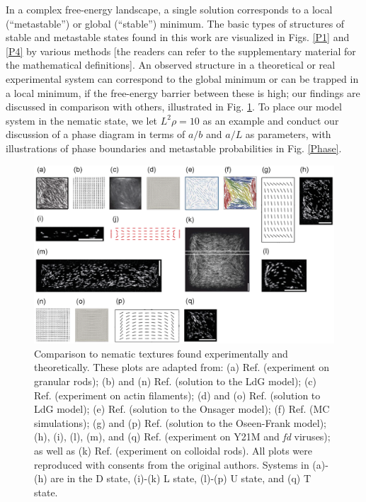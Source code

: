 \documentclass[prl,twocolumn,preprintnumbers,reprint]{revtex4}
\begin{document}
In a complex free-energy landscape, a single solution corresponds to a local (``metastable'') or global (``stable'') minimum.
The basic types of structures of stable and metastable states found in this work are visualized in Figs. \ref{P1} and \ref{P4} by various methods [the readers can refer to the supplementary material for the mathematical definitions]. An observed structure in a theoretical or real experimental system can correspond to the global minimum or can be trapped in a local minimum, if the free-energy barrier between these is high; our findings are discussed in comparison with others, illustrated in Fig. \ref{P12}. To place our model system in the nematic state, we let $L^2 \rho =10$ as an example and conduct our discussion of a phase diagram in terms of $a/b$ and $a/L$ as parameters, with illustrations of phase boundaries and metastable probabilities in Fig. \ref{Phase}.\\



\begin{figure}[!t]\begin{center}
\includegraphics[width = 2\columnwidth]{eps/expCh.eps}
\caption{Comparison to nematic textures found experimentally and theoretically.
These plots are adapted from: (a) Ref. \cite{Galanis2006} (experiment on granular rods); (b) and (n) Ref. \cite{Tsakonas2007} (solution to the LdG model);
(c) Ref. \cite{Mulder2011} (experiment on actin filaments); (d) and (o) Ref. \cite{Luo2012} (solution to LdG model); (e) Ref. \cite{Chen2013} (solution to the Onsager model); (f) Ref. \cite{Mulder2015} (MC simulations); (g) and (p) Ref. \cite{Lewis2014} (solution to the Oseen-Frank model); (h), (i), (l), (m), and (q) Ref. \cite{Lewis2014} (experiment on Y21M and {\it fd} viruses); as well as (k) Ref. \cite{Cortes2017} (experiment on colloidal rods). All plots were reproduced with consents from the original authors. Systems in (a)-(h) are in the D state, (i)-(k) L state, (l)-(p) U state, and (q) T state.
} \label{P12}
\end{center}\end{figure}
\end{document}
